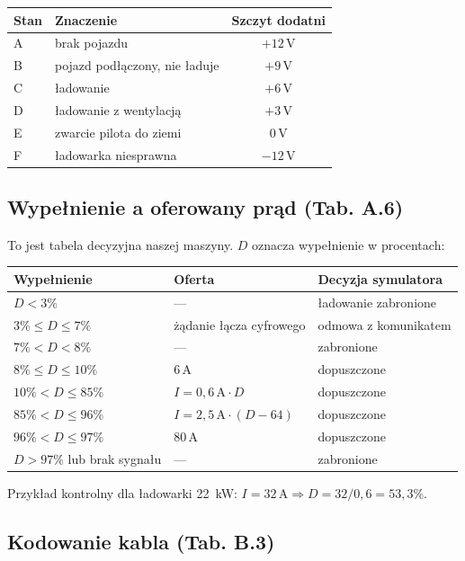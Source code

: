 \documentclass[a4paper,11pt]{article}
\newcommand{\volt}{\,\mathrm{V}}
\newcommand{\amp}{\,\mathrm{A}}
\begin{document}
\begin{center}
\begin{tabular}{llc}
\toprule
Stan & Znaczenie & Szczyt dodatni \\
\midrule
A & brak pojazdu & $+12\volt$ \\
B & pojazd podłączony, nie ładuje & $+9\volt$ \\
C & ładowanie & $+6\volt$ \\
D & ładowanie z wentylacją & $+3\volt$ \\
E & zwarcie pilota do ziemi & $0\volt$ \\
F & ładowarka niesprawna & $-12\volt$ \\
\bottomrule
\end{tabular}
\end{center}

\subsection{Wypełnienie a oferowany prąd (Tab. A.6)}

To jest tabela decyzyjna naszej maszyny. $D$ oznacza wypełnienie w procentach:

\begin{center}
\begin{tabular}{lll}
\toprule
Wypełnienie & Oferta & Decyzja symulatora \\
\midrule
$D<3\%$              & ---                       & ładowanie zabronione \\
$3\% \le D \le 7\%$  & żądanie łącza cyfrowego   & odmowa z komunikatem \\
$7\% < D < 8\%$      & ---                       & zabronione \\
$8\% \le D \le 10\%$ & $6\amp$                   & dopuszczone \\
$10\% < D \le 85\%$  & $I = 0{,}6\amp \cdot D$   & dopuszczone \\
$85\% < D \le 96\%$  & $I = 2{,}5\amp \cdot (D-64)$ & dopuszczone \\
$96\% < D \le 97\%$  & $80\amp$                  & dopuszczone \\
$D>97\%$ lub brak sygnału & ---                  & zabronione \\
\bottomrule
\end{tabular}
\end{center}

Przykład kontrolny dla ładowarki 22~kW: $I=32\amp \Rightarrow D = 32/0{,}6 = 53{,}3\%$.

\subsection{Kodowanie kabla (Tab. B.3)}
\end{document}
